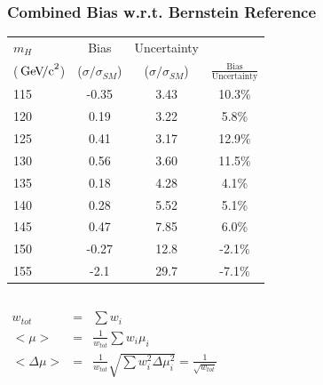 \documentclass{beamer}
\newcommand{\GeVcc}{\ensuremath{\,\mathrm{Ge\kern -0.1em V\!/c}^2}}
\begin{document}
\begin{frame}
\frametitle{Combined Bias w.r.t. Bernstein Reference}
  \begin{center}
    \scriptsize
    \begin{tabular}{|l|c|c|c|} \hline
$m_H$         & Bias & Uncertainty & \\ 
(\GeVcc{})         & ($\sigma/\sigma_{SM}$) & ($\sigma/\sigma_{SM}$) & $\frac{\mathrm{Bias}}{\mathrm{Uncertainty}}$ \\ \hline \hline
115                      &        -0.35 &        3.43 &       10.3\% \\ \hline
120                      &         0.19 &        3.22 &       5.8\% \\ \hline
125                      &         0.41 &        3.17 &       12.9\% \\ \hline
130                      &         0.56 &        3.60 &       11.5\% \\ \hline
135                      &         0.18 &        4.28 &       4.1\% \\ \hline
140                      &         0.28 &        5.52 &       5.1\% \\ \hline
145                      &         0.47 &        7.85 &       6.0\% \\ \hline
150                      &         -0.27 &       12.8 &       -2.1\% \\ \hline
155                      &         -2.1 &       29.7 &       -7.1\% \\ \hline
    \end{tabular}
  \end{center}
  \begin{columns}[c]
     \column{65mm}
    \scriptsize
    \begin{eqnarray*}
      w_{tot} &=& \sum w_i \\
      <\mu> &=& \frac{1}{w_{tot}} \sum w_i \mu_i \\
      <\Delta\mu> &=& \frac{1}{w_{tot}} \sqrt{\sum w_i^2 \Delta\mu_i^2} = \frac{1}{\sqrt{w_{tot}}}
    \end{eqnarray*}
     \column{55mm}
  \end{columns}
\end{frame}
\end{document}
